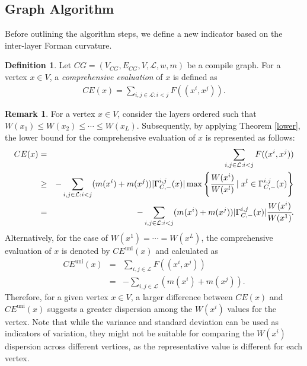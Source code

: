 \documentclass[preprint,12pt,number]{elsarticle}
\theoremstyle{plain} %
\theoremstyle{definition} %
\newtheorem{definition}[theorem]{\indent\sc Definition}
\newtheorem{remark}[theorem]{\indent\sc Remark}
\begin{document}
\subsection{Graph Algorithm}
Before outlining the algorithm steps, we define a new indicator based on the inter-layer Forman curvature.
\begin{definition}
    Let $CG = (V_{CG}, E_{CG}, V, \mathcal{L}, w, m)$ be a compile graph. For a vertex $x \in V$, a \textit{comprehensive evaluation} of $x$ is defined as
    \begin{eqnarray*}
        CE(x) = \sum_{i,j \in \mathcal{L}: i<j} F((x^i,x^j)).
    \end{eqnarray*}
\end{definition}
\begin{remark}
\label{variance}
    For a vertex $x \in V$, consider the layers ordered such that $W(x_1) \leq W(x_2) \leq \cdots \leq W(x_L)$. Subsequently, by applying Theorem \ref{lower}, the lower bound for the comprehensive evaluation of $x$ is represented as follows:
    \begin{eqnarray*}
        CE(x) &=& \sum_{i,j \in \mathcal{L}:i<j} F((x^i,x^j))\\
        &\geq& -\sum_{i,j \in \mathcal{L}:i<j} (m(x^i)+m(x^j)) |\Gamma^{i,j}_{C,-} (x)|\max \left\{ \cfrac{W(x^i)}{W(x^l)} \mid x^l \in \Gamma^{i,j}_{C,-} (x)\right\}\\
        &=& -\sum_{i,j \in \mathcal{L}:i<j}(m(x^i)+m(x^j)) |\Gamma^{i,j}_{C,-} (x)| \cfrac{W(x^i)}{W(x^1)}.
    \end{eqnarray*}
    Alternatively, for the case of $W(x^1) = \cdots = W(x^L)$, the comprehensive evaluation of $x$ is denoted by $CE^\text{uni}(x)$ and calculated as
    \begin{eqnarray*}
        CE^\text{uni}(x) &=& \sum_{i,j \in \mathcal{L}} F((x^i,x^j))\\
        &=& - \sum_{i,j \in \mathcal{L}} (m(x^i) + m(x^j)).
    \end{eqnarray*}
    Therefore, for a given vertex $x \in V$, a larger difference between $CE(x)$ and $CE^\text{uni}(x)$ suggests a greater dispersion among the $W(x^i)$ values for the vertex. Note that while the variance and standard deviation can be used as indicators of variation, they might not be suitable for comparing the $W(x^i)$ dispersion across different vertices, as the representative value is different for each vertex.
\end{remark}
\end{document}
